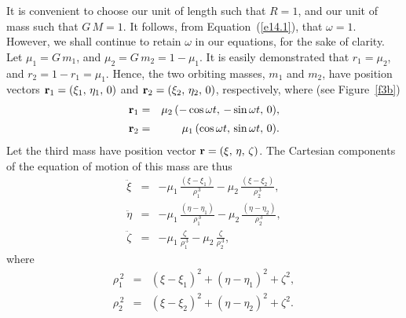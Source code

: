 It is convenient to choose our unit of length such that $R=1$, and our unit of
mass such that $G\,M=1$. It follows, from Equation~(\ref{e14.1}), that $\omega =1$. However, we shall continue to
retain $\omega$ in our equations, for the sake of clarity. Let $\mu_1=G\,m_1$, and $\mu_2=G\,m_2=1-\mu_1$. It is easily demonstrated 
that $r_1 = \mu_2$, and $r_2=1-r_1=\mu_1$. Hence, the two orbiting masses, $m_1$ and $m_2$, have position
vectors ${\bf r}_1=(\xi_1,\,\eta_1,\,0)$ and ${\bf r}_2=(\xi_2,\,\eta_2,\,0)$, respectively, where (see Figure~\ref{f3b})
\begin{eqnarray}\label{e14.3}
{\bf r}_1 &=& \mu_2\,(-\cos \omega t,\,-\sin\omega t,\,0),\\[0.5ex]
{\bf r}_2 &=&\mu_1\,(\cos \omega t,\,\sin\omega t,\,0).\label{e14.4}
\end{eqnarray}
Let the third mass have position vector ${\bf r} = (\xi,\,\eta,\,\zeta)$. The
Cartesian components of the equation of motion of this mass are thus
\begin{eqnarray}\label{e14.5a}
\ddot{\xi}&=& -\mu_1\,\frac{(\xi-\xi_1)}{\rho_1^{\,3}} - \mu_2\,\frac{(\xi-\xi_2)}{\rho_2^{\,3}},\\[0.5ex]
\ddot{\eta}&=& -\mu_1\,\frac{(\eta-\eta_1)}{\rho_1^{\,3}} - \mu_2\,\frac{(\eta-\eta_2)}{\rho_2^{\,3}},\\[0.5ex]
\ddot{\zeta}&=& -\mu_1\,\frac{\zeta}{\rho_1^{\,3}} - \mu_2\,\frac{\zeta}{\rho_2^{\,3}},\label{e14.5c}
\end{eqnarray}
where
\begin{eqnarray}\label{e14.6}
\rho_1^{\,2} &=& (\xi-\xi_1)^2+(\eta-\eta_1)^2 + \zeta^2,\\[0.5ex]
\rho_2^{\,2} &=& (\xi-\xi_2)^2+(\eta-\eta_2)^2 + \zeta^2.\label{e14.7}
\end{eqnarray}

